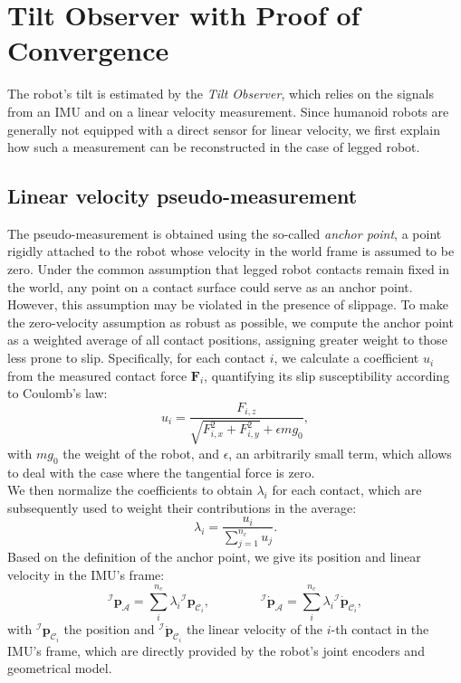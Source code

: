 \documentclass[10pt,twocolumn]{ICCAS}
\begin{document}
\section{Tilt Observer with Proof of Convergence} \label{sec:Tilt}
The robot's tilt is estimated by the \emph{Tilt Observer}, which relies on the signals from an IMU and on a linear velocity measurement. Since humanoid robots are generally not equipped with a direct sensor for linear velocity, we first explain how such a measurement can be reconstructed in the case of legged robot.

\subsection{Linear velocity pseudo-measurement}
The pseudo-measurement is obtained using the so-called \emph{anchor point}, a point rigidly attached to the robot whose velocity in the world frame is assumed to be zero. Under the common assumption that legged robot contacts remain fixed in the world, any point on a contact surface could serve as an anchor point. However, this assumption may be violated in the presence of slippage. To make the zero-velocity assumption as robust as possible, we compute the anchor point as a weighted average of all contact positions, assigning greater weight to those less prone to slip. Specifically, for each contact $i$, we calculate a coefficient $u_i$ from the measured contact force $\boldsymbol{F}_{i}$, quantifying its slip susceptibility according to Coulomb's law: 
\begin{equation}
    u_{i} = \frac{F_{i,z}}{\sqrt{F_{i,x}^2 + F_{i,y}^2} + \epsilon mg_{0}},\label{eq:ratio_ui}
\end{equation}
with $mg_{0}$ the weight of the robot, and $\epsilon$, an arbitrarily small term, which allows to deal with the case where the tangential force is zero. \\
We then normalize the coefficients to obtain $\lambda_i$ for each contact, which are subsequently used to weight their contributions in the average:
\begin{equation}
    \lambda_{i}=\frac{u_{i}}{\sum^{n_{c}}_{j=1}u_{j}}. \label{eq:lambda_i}
\end{equation}
Based on the definition of the anchor point, we give its position and linear velocity in the IMU's frame:
\begin{equation} 
{^{\mathcal{I}}}\boldsymbol{p}_{\mathcal{A}} = \sum^{n_{c}}_{i} \lambda_{i}  {^{\mathcal{I}}} \boldsymbol{p}_{{\mathcal{C}}_{i}} , \qquad \qquad {^{\mathcal{I}}} \dot{\boldsymbol{p}}_{\mathcal{A}} = \sum^{n_{c}}_{i} \lambda_{i}  {^{\mathcal{I}}} \dot{\boldsymbol{p}}_{{\mathcal{C}}_{i}}, \label{eq:imuAnchorKine} 
\end{equation} 
with ${^{\mathcal{I}}} \boldsymbol{p}_{{\mathcal{C}}_{i}}$ the position and ${^{\mathcal{I}}} \dot{\boldsymbol{p}}_{{\mathcal{C}}_{i}}$ the linear velocity of the $i$-th contact in the IMU's frame, which are directly provided by the robot's joint encoders and geometrical model.
\end{document}
